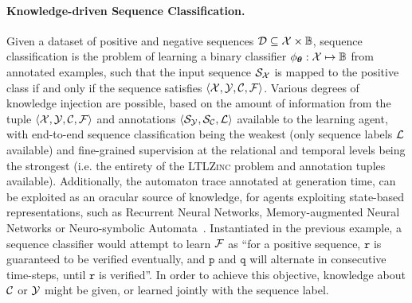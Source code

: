 \paragraph{Knowledge-driven Sequence Classification.} Given a dataset of positive and negative sequences ${\mathcal{D}} \subseteq {\mathcal{X}} \times {\mathbb{B}}$, sequence classification is the problem of learning a binary classifier $\phi_{\bm{\theta}}: {\mathcal{X}} \mapsto {\mathbb{B}}$ from annotated examples, such that the input sequence ${\mathcal{S}}_{\mathcal{X}}$ is mapped to the positive class if and only if the sequence satisfies $\langle {\mathcal{X}}, {\mathcal{Y}}, {\mathcal{C}}, {\mathcal{F}} \rangle$. Various degrees of knowledge injection are possible, based on the amount of information from the tuple $\langle {\mathcal{X}}, {\mathcal{Y}}, {\mathcal{C}}, {\mathcal{F}} \rangle$ and annotations $\langle {\mathcal{S}}_{\mathcal{Y}}, {\mathcal{S}}_{\mathcal{C}}, {\mathcal{L}}\rangle$ available to the learning agent, with end-to-end sequence classification being the weakest (only sequence labels ${\mathcal{L}}$ available) and fine-grained supervision at the relational and temporal levels being the strongest (i.e. the entirety of the \textsc{LTLZinc} problem and annotation tuples available). Additionally, the automaton trace annotated at generation time, can be exploited as an oracular source of knowledge, for agents exploiting state-based representations, such as Recurrent Neural Networks, Memory-augmented Neural Networks or Neuro-symbolic Automata~\cite{manginas2024nesya}.
Instantiated in the previous example, a sequence classifier would attempt to learn ${\mathcal{F}}$ as ``for a positive sequence, $\texttt{r}$ is guaranteed to be verified eventually, and $\texttt{p}$ and $\texttt{q}$ will alternate in consecutive time-steps, until $\texttt{r}$ is verified''. In order to achieve this objective, knowledge about ${\mathcal{C}}$ or ${\mathcal{Y}}$ might be given, or learned jointly with the sequence label.

